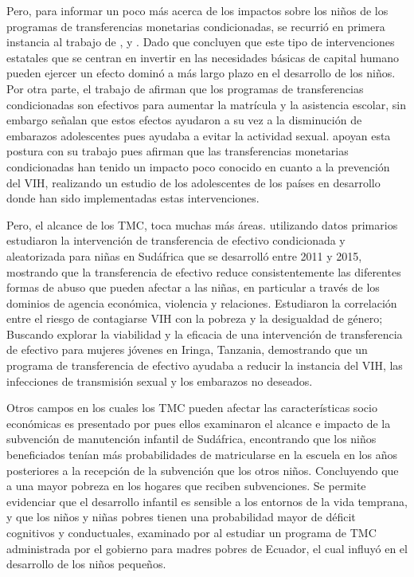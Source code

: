 \documentclass[AER]{AEA}
\begin{document}
Pero, para informar un poco más acerca de los impactos sobre los niños de los programas de transferencias monetarias condicionadas, se recurrió en primera instancia al trabajo de \citep{Ozer2009EffectsProblems}, \citep{Baird2010TheWomen} y \citep{Pettifor2012CanPrevention}. Dado que \cite{Ozer2009EffectsProblems} concluyen que este tipo de intervenciones estatales que se centran en invertir en las necesidades básicas de capital humano pueden ejercer un efecto dominó a más largo plazo en el desarrollo de los niños. Por otra parte, el trabajo de \cite{Baird2010TheWomen} afirman que los programas de transferencias condicionadas son efectivos para aumentar la matrícula y la asistencia escolar, sin embargo señalan que estos efectos ayudaron a su vez a la disminución de embarazos adolescentes pues ayudaba a evitar la actividad sexual. \cite{Pettifor2012CanPrevention} apoyan esta postura con su trabajo pues afirman que las transferencias monetarias condicionadas han tenido un impacto poco conocido en cuanto a  la prevención del VIH, realizando un estudio de los adolescentes de los países en desarrollo donde han sido implementadas estas intervenciones.

Pero, el alcance de los TMC, toca muchas más áreas. \cite{Kilburn2020The068} utilizando datos primarios estudiaron la intervención de transferencia de efectivo condicionada y aleatorizada para niñas en Sudáfrica que se desarrolló entre 2011 y 2015, mostrando que la transferencia de efectivo reduce consistentemente las diferentes formas de abuso que pueden afectar  a las niñas, en particular a través de los dominios de agencia económica, violencia y relaciones. \cite{Kennedy2014ExploringTanzania} Estudiaron la correlación entre el riesgo de contagiarse VIH con la pobreza y la desigualdad de género; Buscando explorar la viabilidad y la eficacia de una intervención de transferencia de efectivo para mujeres jóvenes en Iringa, Tanzania, demostrando que un programa de transferencia de efectivo ayudaba a reducir la instancia del VIH, las infecciones de transmisión sexual y los embarazos no deseados. 
 
Otros campos en los cuales los TMC pueden afectar las características socio económicas es presentado por \cite{Case2005HeKwaZulu-Natal} pues ellos examinaron el alcance e impacto de la subvención de manutención infantil de Sudáfrica, encontrando que los niños beneficiados tenían más probabilidades de matricularse en la escuela en los años posteriores a la recepción de la subvención que los otros niños. Concluyendo que a una mayor pobreza en los hogares que reciben subvenciones. Se permite evidenciar que el desarrollo infantil es sensible a los entornos de la vida temprana, y que los niños y niñas pobres tienen una probabilidad mayor de déficit cognitivos y conductuales, examinado por \cite{Paxson2010DoesAnd} al estudiar un programa de TMC administrada por el gobierno para madres pobres de Ecuador, el cual influyó en el desarrollo de los niños pequeños.
\end{document}
